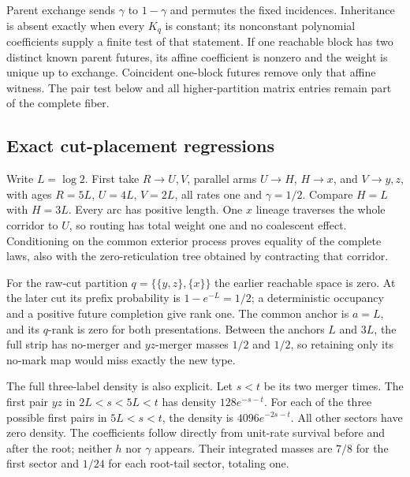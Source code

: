 \documentclass[11pt]{article}
\begin{document}
Parent exchange sends $\gamma$ to $1-\gamma$ and permutes the fixed incidences.  Inheritance is absent exactly when every $K_q$ is constant; its nonconstant polynomial coefficients supply a finite test of that statement.  If one reachable block has two distinct known parent futures, its affine coefficient is nonzero and the weight is unique up to exchange.  Coincident one-block futures remove only that affine witness.  The pair test below and all higher-partition matrix entries remain part of the complete fiber.

\subsection{Exact cut-placement regressions}
\label{sec:supp-port-regressions}

Write $L=\log2$.  First take $R\to U,V$, parallel arms $U\to H$, $H\to x$, and $V\to y,z$, with ages $R=5L$, $U=4L$, $V=2L$, all rates one and $\gamma=1/2$.  Compare $H=L$ with $H=3L$.  Every arc has positive length.  One $x$ lineage traverses the whole corridor to $U$, so routing has total weight one and no coalescent effect.  Conditioning on the common exterior process proves equality of the complete laws, also with the zero-reticulation tree obtained by contracting that corridor.

For the raw-cut partition $q=\{\{y,z\},\{x\}\}$ the earlier reachable space is zero.  At the later cut its prefix probability is $1-e^{-L}=1/2$; a deterministic occupancy and a positive future completion give rank one.  The common anchor is $a=L$, and its $q$-rank is zero for both presentations.  Between the anchors $L$ and $3L$, the full strip has no-merger and $yz$-merger masses $1/2$ and $1/2$, so retaining only its no-mark map would miss exactly the new type.

The full three-label density is also explicit.  Let $s<t$ be its two merger times.  The first pair $yz$ in $2L<s<5L<t$ has density $128e^{-s-t}$.  For each of the three possible first pairs in $5L<s<t$, the density is $4096e^{-2s-t}$.  All other sectors have zero density.  The coefficients follow directly from unit-rate survival before and after the root; neither $h$ nor $\gamma$ appears.  Their integrated masses are $7/8$ for the first sector and $1/24$ for each root-tail sector, totaling one.
\end{document}
